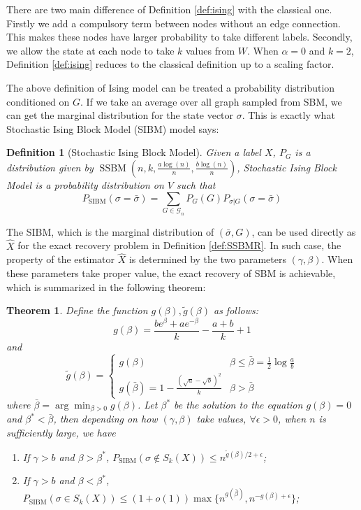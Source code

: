 \documentclass[journal]{IEEEtran}
\newtheorem{theorem}{Theorem}
\newtheorem{definition}{Definition}
\newcommand{\A}{\frac{a \log(n)}{n}}
\newcommand{\B}{\frac{b \log(n)}{n}}
\newcommand{\cG}{\mathcal{G}}
\newcommand{\1}{\mathbbm{1}}
\DeclareMathOperator{\SSBM}{SSBM}
\DeclareMathOperator{\SIBM}{SIBM}
\begin{document}
There are two main difference of Definition \ref{def:ising} with the classical one. Firstly we add a compulsory term
between nodes without an edge connection. This makes these nodes have larger probability to take different labels.
Secondly, we allow the state at each node to take $k$ values from $W$.
When $\alpha = 0$ and $k=2$, Definition \ref{def:ising}
reduces to the classical definition up to a scaling factor.

The above definition of Ising model can be treated a probability distribution conditioned on $G$.
If we take an average over all graph sampled from SBM, we can get the marginal distribution for the state vector $\sigma$.
This is exactly what Stochastic Ising Block Model (SIBM) model says:
\begin{definition}[Stochastic Ising Block Model]
	Given a label $X$, $P_G$ is a distribution given by $\SSBM(n,k,\A,\B)$, Stochastic Ising Block Model
	is a probability distribution on $V$ such that
\begin{equation}\label{eq:sibm}
P_{\SIBM}(\sigma = \bar{\sigma}) = \sum_{G \in \cG_n} P_G(G) P_{\sigma | G}(\sigma = \bar{\sigma}) 
\end{equation}
\end{definition}
The SIBM, which is the marginal distribution of $(\bar{\sigma}, G)$, can be used directly as $\hat{X}$ for the exact recovery problem in Definition \ref{def:SSBMR}.  In such case, the property of the estimator $\hat{X}$ is determined
by the two parameters $(\gamma, \beta)$. When these parameters take proper value, the exact recovery of SBM is achievable, which is summarized in the following theorem:
\begin{theorem}\label{thm:phase_transition}
Define the function $g(\beta), \tilde{g}(\beta)$ as follows:
\begin{equation}
g(\beta) = \frac{be^{\beta} + a e^{-\beta}}{k} - \frac{a+b}{k} +1
\end{equation}
and
\begin{equation}
\tilde{g}(\beta) = \begin{cases}
g(\beta) & \beta \leq \bar{\beta} = \frac{1}{2}\log \frac{a}{b} \\
g(\bar{\beta}) = 1 - \frac{(\sqrt{a} - \sqrt{b})^2}{k} & \beta > \bar{\beta}
\end{cases}
\end{equation}
where $\bar{\beta} =  \arg\min_{\beta > 0} g(\beta)$.
Let $\beta^*$ be the solution to the equation $g(\beta) = 0$ and $\beta^* < \bar{\beta}$, then depending on
how $(\gamma, \beta)$ take values, $\forall \epsilon > 0$, when $n$ is sufficiently large, we have
\begin{enumerate}
\item If $\gamma > b$ and $\beta > \beta^*$,  $P_{\SIBM}(\sigma \not\in S_k(X)) \leq n^{\tilde{g}(\beta)/2 + \epsilon}$;
\item If $\gamma > b$ and $\beta < \beta^*$, $P_{\SIBM}(\sigma \in S_k(X)) \leq (1+o(1))\max\{n^{g(\bar{\beta})}, n^{-g(\beta) + \epsilon}\}$;
\end{enumerate}
\end{theorem}
\end{document}
